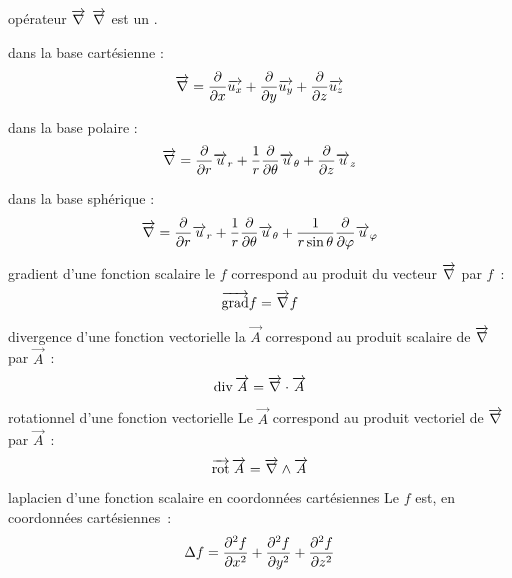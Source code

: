 

\begin{adjustwidth}{-3cm}{-3cm}

\setcounter{chapitre}{numéro}

\begin{definition}{}{opérateur $\overrightarrow{\nabla}$}
    $\overrightarrow{\nabla}$ est un .
    \begin{enumeratebf}
        \item dans la base cartésienne : $$ \displaystyle \overrightarrow{\nabla} = \frac{\partial}{\partial x}\overrightarrow{u_x} + \frac{\partial}{\partial y}\overrightarrow{u_y} + \frac{\partial}{\partial z}\overrightarrow{u_z}$$
        \item dans la base polaire : $$ \overrightarrow{\nabla} =  \displaystyle {\partial \over \partial r}\overrightarrow u_r
        + {1 \over r}{\partial \over \partial \theta }\overrightarrow u_\theta
        + {\partial \over \partial z} \overrightarrow u_z$$
        \item dans la base sphérique : $$ \overrightarrow{\nabla} = \displaystyle {\partial \over \partial r}\overrightarrow u_r
        + {1 \over r}  {\partial \over \partial \theta}\overrightarrow u_\theta
        + {1 \over r\sin\theta} {\partial \over \partial \varphi}\overrightarrow u_\varphi$$
    \end{enumeratebf}
\end{definition}

\begin{definition}{}{gradient d'une fonction scalaire}
    le  $f$ correspond au produit du vecteur $\overrightarrow{\nabla}$ par $f$~:
    $$\overrightarrow{\mathrm{grad}} f = \overrightarrow{\nabla} f$$
\end{definition}

\begin{definition}{}{divergence d'une fonction vectorielle}
    la  $\vec{A}$ correspond au produit scalaire de $\overrightarrow{\nabla}$ par $\vec{A}$~:
    $$\mathrm{div}\, \overrightarrow{A} = \overrightarrow{\nabla} \cdot \overrightarrow{A}$$
\end{definition}

\begin{definition}{}{rotationnel d'une fonction vectorielle}
    Le  $\vec{A}$ correspond au produit vectoriel de $\overrightarrow{\nabla}$ par $\vec{A}$~:
    $$\overrightarrow{\mathrm{rot}}\, \overrightarrow{A} = \overrightarrow{\nabla} \wedge \overrightarrow{A}$$
\end{definition}

\begin{definition}{}{laplacien d'une fonction scalaire en coordonnées cartésiennes}
    Le  $f$ est, en coordonnées cartésiennes~:
    $$\Delta f = \frac{\partial^{2}f}{\partial x^{2}} + \frac{\partial^{2}f}{\partial y^{2}} + \frac{\partial^{2}f}{\partial z^{2}}$$
\end{definition}


\end{adjustwidth}
